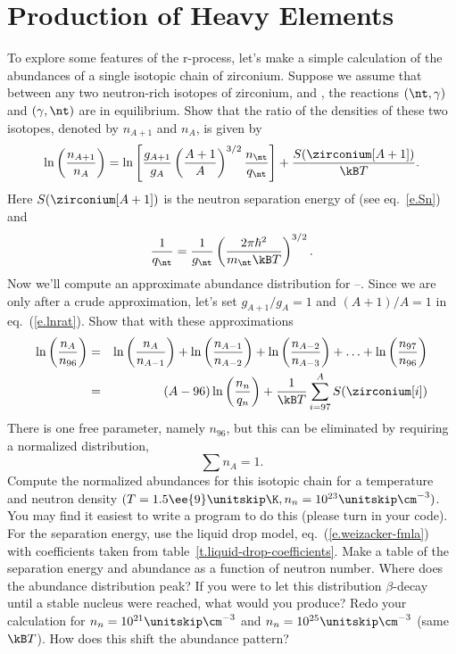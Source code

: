 \chapter{Production of Heavy Elements}

To explore some features of the r-process, let's make a simple calculation of the abundances of a single isotopic chain of zirconium.  Suppose we assume that between any two neutron-rich isotopes of zirconium, \zirconium[A+1] and \zirconium[A], the reactions $(\nt,\gamma)$ and $(\gamma,\nt)$ are in equilibrium.  Show that the ratio of the densities of these two isotopes, denoted by $n_{A+1}$ and $n_{A}$, is given by
\begin{equation}\label{e.lnrat}
	\ln\left(\frac{n_{A+1}}{n_{A}}\right) = \ln\left[\frac{g_{A+1}}{g_{A}}\left(\frac{A+1}{A}\right)^{3/2}\frac{n_{\nt}}{q_{\nt}}\right] + \frac{S(\zirconium[A+1])}{\kB T}.
\end{equation}
Here $S(\zirconium[A+1])$ is the neutron separation energy of \zirconium[A+1] (see eq.~\ref{e.Sn}) and
\[
	\frac{1}{q_{\nt}} = \frac{1}{g_{\nt}}\left(\frac{2\pi\hbar^{2}}{m_{\nt}\kB T}\right)^{3/2}.
\]
Now we'll compute an approximate abundance distribution for \zirconium[96]--\zirconium[116].  Since we are only after a crude approximation, let's set $g_{A+1}/g_{A} = 1$ and $(A+1)/A = 1$ in eq.~(\ref{e.lnrat}). Show that with these approximations
\begin{eqnarray}
	\ln\left(\frac{n_{A}}{n_{96}}\right) &=& \ln\left(\frac{n_{A}}{n_{A-1}}\right)
		+ \ln\left(\frac{n_{A-1}}{n_{A-2}}\right)
		+ \ln\left(\frac{n_{A-2}}{n_{A-3}}\right) + \ldots
		+ \ln\left(\frac{n_{97}}{n_{96}}\right) \nonumber \\
		&=& (A-96)\ln\left(\frac{n_{n}}{q_{n}}\right) + \frac{1}{\kB T}\sum_{i=97}^{A} S(\zirconium[i])
\end{eqnarray}
There is one free parameter, namely $n_{96}$, but this can be eliminated by requiring a normalized distribution,
\[ \sum n_{A} = 1. \]
Compute the normalized abundances for this isotopic chain for a temperature and neutron density $(T = 1.5\ee{9}\nsp\K, n_{n} = 10^{23}\nsp\cm^{-3})$.  You may find it easiest to write a program to do this (please turn in your code). For the separation energy, use the liquid drop model, eq.~(\ref{e.weizacker-fmla}) with coefficients taken from table~\ref{t.liquid-drop-coefficients}.  Make a table of the separation energy and abundance as a function of neutron number. Where does the abundance distribution peak?  If you were to let this distribution $\beta$-decay until a stable nucleus were reached, what would you produce? Redo your calculation for $n_{n} = 10^{21}\nsp\cm^{-3}$ and $n_{n} = 10^{25}\nsp\cm^{-3}$ (same $\kB T$). How does this shift the abundance pattern?
